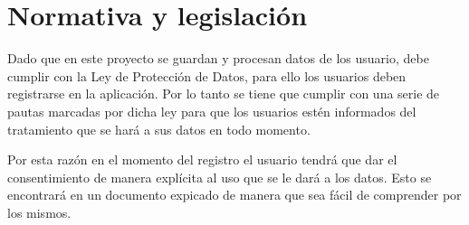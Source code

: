 \section{Normativa y legislación}

Dado que en este proyecto se guardan y procesan datos de los usuario, debe cumplir
con la Ley de Protección de Datos, para ello los usuarios deben registrarse en la
aplicación. Por lo tanto se tiene que cumplir con una serie de pautas marcadas
por dicha ley para que los usuarios estén informados del tratamiento que se hará
a sus datos en todo momento.

\medskip
Por esta razón en el momento del registro el usuario tendrá que dar el consentimiento
de manera explícita al uso que se le dará a los datos. Esto se encontrará en un
documento expicado de manera que sea fácil de comprender por los mismos.